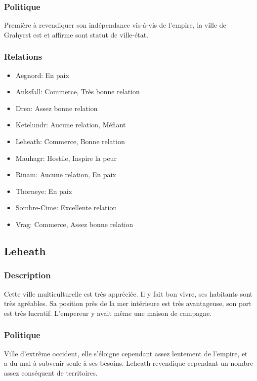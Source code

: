 \subsubsection{Politique}
Première à revendiquer son indépendance vis-à-vis de l'empire, la ville de Grahyrst est et affirme sont statut de ville-état.
\subsubsection{Relations} 
\begin{itemize}
\item Aegnord: En paix  
\item Anksfall: Commerce, Très bonne relation 
\item Dren: Assez bonne relation    
\item Ketelundr: Aucune relation, Méfiant 
\item Leheath: Commerce, Bonne relation 
\item Mauhagr: Hostile, Inspire la peur  
\item Rinam: Aucune relation, En paix 
\item Thorneye: En paix 
\item Sombre-Cime: Excellente relation 
\item Vrag: Commerce, Assez bonne relation 
\end{itemize}
\subsection{Leheath}
\subsubsection{Description}
\hypertarget {leheath}{}Cette ville multiculturelle est très appréciée.
Il y fait bon vivre, ses habitants sont très agréables.
Sa position près de la mer intérieure est très avantageuse, son port est très lucratif.
L'empereur y avait même une maison de campagne.
\subsubsection{Politique}
Ville d'extrême occident, elle s'éloigne cependant assez lentement de l'empire, et a du mal à subvenir seule à ses besoins. Leheath revendique cependant un nombre assez conséquent de territoires.
